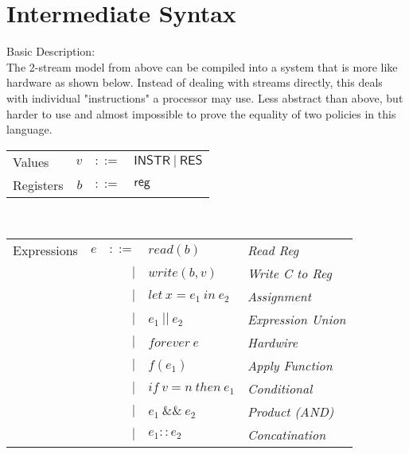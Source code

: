 \documentclass[12pt, letterpaper]{article}
\begin{document}


\section{Intermediate Syntax}


    Basic Description:\\
    The 2-stream model from above can be compiled into a system that is more like hardware as shown below.  Instead of dealing with streams directly, this deals with individual "instructions" a processor may use.  Less abstract than above, but harder to use and almost impossible to prove the equality of two policies in this language.\\

    \begin{tabular}{l r c l}
        Values        & $v$     & $::=$     & $\mathsf{INSTR\ |\ RES}$\\
        Registers     & $b$     & $::=$     & $\mathsf{reg}$
    \end{tabular}\\

    \begin{tabular}{l c r l l}
       Expressions  & $e$    & $::=$  & $read(b)$       & \textit{Read Reg}        \\
                    &        & $\mid$ & $write(b,v)$    & \textit{Write C to Reg}     \\
                    &        & $\mid$ & $let\ x = e_1\ in\ e_2$ & \textit{Assignment}        \\  
                    &        & $\mid$ & $e_1\ ||\ e_2$    & \textit{Expression Union}        \\  
                    &        & $\mid$ & $forever\ e$    & \textit{Hardwire}\\  
                    &        & $\mid$ & $f(e_1)$        & \textit{Apply Function} \\  
                    &        & $\mid$ & $if\ v = n\ then\ e_1$            & \textit{Conditional} \\
                    &        & $\mid$ & $e_1\ \&\&\ e_2$            & \textit{Product (AND)}\\
                    &        & $\mid$ & $e_1 :: e_2$            & \textit{Concatination}
    \end{tabular}\\
\end{document}
